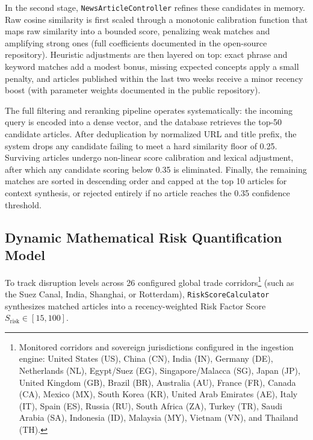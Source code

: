\documentclass[conference]{IEEEtran}
\begin{document}
In the second stage, \texttt{NewsArticleController} refines these candidates in memory. Raw cosine similarity is first scaled through a monotonic calibration function that maps raw similarity into a bounded score, penalizing weak matches and amplifying strong ones (full coefficients documented in the open-source repository). Heuristic adjustments are then layered on top: exact phrase and keyword matches add a modest bonus, missing expected concepts apply a small penalty, and articles published within the last two weeks receive a minor recency boost (with parameter weights documented in the public repository).

The full filtering and reranking pipeline operates systematically: the incoming query is encoded into a dense vector, and the database retrieves the top-50 candidate articles. After deduplication by normalized URL and title prefix, the system drops any candidate failing to meet a hard similarity floor of 0.25. Surviving articles undergo non-linear score calibration and lexical adjustment, after which any candidate scoring below 0.35 is eliminated. Finally, the remaining matches are sorted in descending order and capped at the top 10 articles for context synthesis, or rejected entirely if no article reaches the 0.35 confidence threshold.

\subsection{Dynamic Mathematical Risk Quantification Model}
To track disruption levels across 26 configured global trade corridors\footnote{Monitored corridors and sovereign jurisdictions configured in the ingestion engine: United States (US), China (CN), India (IN), Germany (DE), Netherlands (NL), Egypt/Suez (EG), Singapore/Malacca (SG), Japan (JP), United Kingdom (GB), Brazil (BR), Australia (AU), France (FR), Canada (CA), Mexico (MX), South Korea (KR), United Arab Emirates (AE), Italy (IT), Spain (ES), Russia (RU), South Africa (ZA), Turkey (TR), Saudi Arabia (SA), Indonesia (ID), Malaysia (MY), Vietnam (VN), and Thailand (TH).} (such as the Suez Canal, India, Shanghai, or Rotterdam), \texttt{RiskScoreCalculator} synthesizes matched articles into a recency-weighted Risk Factor Score $S_{\text{risk}} \in [15, 100]$.
\end{document}
